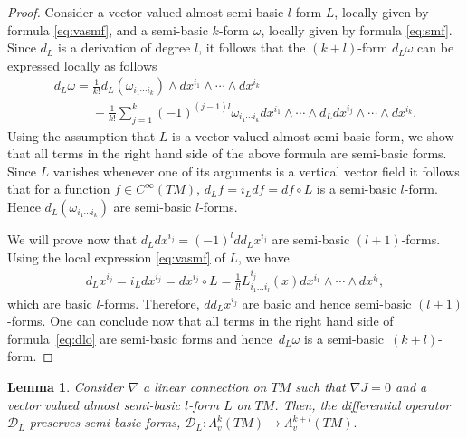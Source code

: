\documentclass[11pt]{article}
\numberwithin{equation}{section}
\newtheorem{Lemma}[Theorem]{Lemma}
\begin{document}
\begin{proof}
Consider a vector valued almost semi-basic $l$-form $L$, locally given
by formula \eqref{eq:vasmf}, and a semi-basic $k$-form $\omega$, locally given by formula
\eqref{eq:smf}. Since $d_L$ is a derivation of degree $l$, it follows
that the $(k+l)$-form $d_L\omega$ can be
expressed locally as follows
\begin{gather}
\nonumber d_L\omega  =  \frac{1}{k!}d_L(\omega_{i_1\cdots
  i_k})\wedge  dx^{i_1}\wedge \cdots \wedge dx^{i_k}  \\[-0.5ex]
 \phantom{d_L\omega  =}{}  +  \frac{1}{k!}
\sum^k_{j=1}(-1)^{(j-1)l} \omega_{i_1\cdots
  i_k} dx^{i_1}\wedge \cdots \wedge d_Ldx^{i_j} \wedge \cdots \wedge
dx^{i_k}. \label{eq:dlo}
\end{gather}
Using the assumption that $L$ is a vector valued almost semi-basic
form, we show that all terms in the right hand side of the above formula
are semi-basic forms. Since $L$ vanishes whenever one of its arguments
is a vertical vector f\/ield it follows that for a function $f\in C^{\infty}(TM)$, $d_Lf=i_Ldf=df\circ
L$ is a semi-basic $l$-form. Hence $d_L(\omega_{i_1\cdots i_k})$ are semi-basic $l$-forms.

We will prove now that $d_Ldx^{i_j}=(-1)^ldd_Lx^{i_j} $ are semi-basic
$(l+1)$-forms. Using the local expression \eqref{eq:vasmf} of $L$, we have
\begin{gather*} d_Lx^{i_j}=i_Ldx^{i_j} = dx^{i_j}\circ L =\frac{1}{l!}
L^{i_j}_{i_1\dots i_l}(x) dx^{i_1}\wedge \cdots \wedge
dx^{i_l},%
\end{gather*}
which are basic $l$-forms. Therefore, $dd_Lx^{i_j}$ are basic and hence
semi-basic $(l+1)$-forms.
One can conclude now that all terms in the right hand side of formula~\eqref{eq:dlo} are
semi-basic forms and hence~$d_L\omega$ is a semi-basic~$(k+l)$-form.
\end{proof}

\begin{Lemma} \label{lem:nablaomega} Consider $\nabla$ a linear connection on $TM$ such
that $\nabla J=0$ and a vector valued almost semi-basic $l$-form
$L$ on $TM$. Then, the differential operator ${\mathcal D}_L$
preserves semi-basic forms, ${\mathcal D}_L: \Lambda^k_v(TM) \to
\Lambda^{k+l}_v(TM).$
\end{Lemma}
\end{document}
